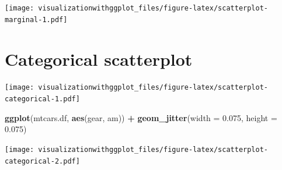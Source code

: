 \documentclass[]{krantz}
\makeatletter
\newenvironment{Shaded}{\begin{snugshade}}{\end{snugshade}}
\newcommand{\KeywordTok}[1]{\textcolor[rgb]{0.13,0.29,0.53}{\textbf{#1}}}
\newcommand{\DataTypeTok}[1]{\textcolor[rgb]{0.13,0.29,0.53}{#1}}
\newcommand{\FloatTok}[1]{\textcolor[rgb]{0.00,0.00,0.81}{#1}}
\newcommand{\StringTok}[1]{\textcolor[rgb]{0.31,0.60,0.02}{#1}}
\newcommand{\OperatorTok}[1]{\textcolor[rgb]{0.81,0.36,0.00}{\textbf{#1}}}
\newcommand{\NormalTok}[1]{#1}
\newenvironment{kframe}{%
\medskip{}
\setlength{\fboxsep}{.8em}
 \def\at@end@of@kframe{}%
 \ifinner\ifhmode%
  \def\at@end@of@kframe{\end{minipage}}%
  \begin{minipage}{\columnwidth}%
 \fi\fi%
 \def\FrameCommand##1{\hskip\@totalleftmargin \hskip-\fboxsep
 \colorbox{shadecolor}{##1}\hskip-\fboxsep
     \hskip-\linewidth \hskip-\@totalleftmargin \hskip\columnwidth}%
 \MakeFramed {\advance\hsize-\width
   \@totalleftmargin\z@ \linewidth\hsize
   \@setminipage}}%
 {\par\unskip\endMakeFramed%
 \at@end@of@kframe}
\renewenvironment{Shaded}{\begin{kframe}}{\end{kframe}}
\theoremstyle{definition}
\theoremstyle{definition}
\theoremstyle{definition}
\theoremstyle{remark}
\makeatother
\begin{document}
\texttt{[image: visualizationwithggplot\_files/figure-latex/scatterplot-marginal-1.pdf]}

\section{Categorical scatterplot}\label{categorical-scatterplot}

\begin{Shaded}
\end{Shaded}

\texttt{[image: visualizationwithggplot\_files/figure-latex/scatterplot-categorical-1.pdf]}

\begin{Shaded}
\begin{Highlighting}[]
 \KeywordTok{ggplot}\NormalTok{(mtcars.df, }\KeywordTok{aes}\NormalTok{(gear, am)) }\OperatorTok{+}\StringTok{ }
\StringTok{  }\KeywordTok{geom_jitter}\NormalTok{(}\DataTypeTok{width =} \FloatTok{0.075}\NormalTok{, }\DataTypeTok{height =} \FloatTok{0.075}\NormalTok{) }
\end{Highlighting}
\end{Shaded}

\texttt{[image: visualizationwithggplot\_files/figure-latex/scatterplot-categorical-2.pdf]}

\begin{Shaded}
\end{Shaded}
\end{document}
